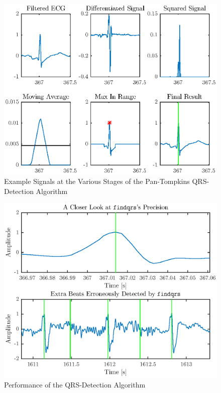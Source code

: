 \documentclass[titlepage,12pt,letter]{article}
\begin{document}
\begin{figure}[hbtp]
    \centering
    \includegraphics[height=0.42\textheight]{../figures/figures_03}
    \caption{Example Signals at the Various Stages of the Pan-Tompkins
    QRS-Detection Algorithm}
    \label{fig:qrs}
\end{figure}

\begin{figure}[hbtp]
    \centering
    \includegraphics[height=0.42\textheight]{../figures/figures_04}
    \caption{Performance of the QRS-Detection Algorithm}
    \label{fig:perf}
\end{figure}
\end{document}

